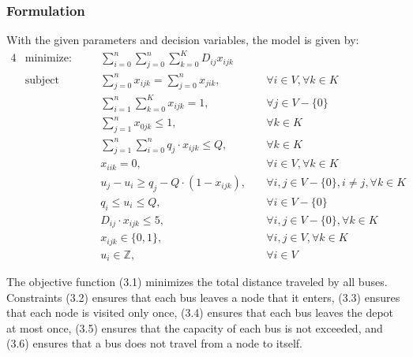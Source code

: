 \documentclass[12pt]{article}
\begin{document}
\subsubsection{Formulation}
With the given parameters and decision variables, the model is given by:
\begin{alignat}{4}
     & \text{minimize:}   &       & \sum_{i=0}^{n} \sum_{j=0}^{n} \sum_{k=0}^{K} D_{ij} x_{ijk}                                                              \\
     & \text{subject to:} & \quad & \sum_{j=0}^{n} x_{ijk} = \sum_{j=0}^{n} x_{jik},            & \quad \forall i \in V, \forall k \in K                     \\
     &                    & \quad & \sum_{i=1}^{n} \sum_{k=0}^K x_{ijk} = 1,                    & \quad \forall j \in V - \{0\}                              \\
     &                    & \quad & \sum_{j=1}^{n} x_{0jk} \leq 1,                              & \quad \forall k \in K                                      \\
     &                    & \quad & \sum_{j=1}^{n} \sum_{i=0}^{n} q_j \cdot x_{ijk} \leq Q,     & \quad \forall k \in K                                      \\
     &                    & \quad & x_{iik} = 0,                                                & \quad \forall i \in V, \forall k \in K                     \\
     &                    & \quad & u_j - u_i \geq q_j - Q \cdot (1 - x_{ijk}),                 & \quad \forall i,j \in V - \{0\}, i \neq j, \forall k \in K \\
     &                    & \quad & q_i \leq u_i \leq Q,                                        & \quad \forall i \in V - \{0\}                              \\
     &                    & \quad & D_{ij} \cdot x_{ijk} \leq 5,                                & \quad \forall i,j \in V - \{0\}, \forall k \in K           \\
     &                    & \quad & x_{ijk} \in \{0,1\},                                        & \quad \forall i,j \in V, \forall k \in K                   \\
     &                    & \quad & u_i \in \mathbb{Z},                                         & \quad \forall i \in V
\end{alignat}

The objective function (3.1) minimizes the total distance traveled by all buses. Constraints (3.2) ensures that each bus leaves a node that it enters,
(3.3) ensures that each node is visited only once,
(3.4) ensures that each bus leaves the depot at most once,
(3.5) ensures that the capacity of each bus is not exceeded,
and (3.6) ensures that a bus does not travel from a node to itself.
\end{document}
